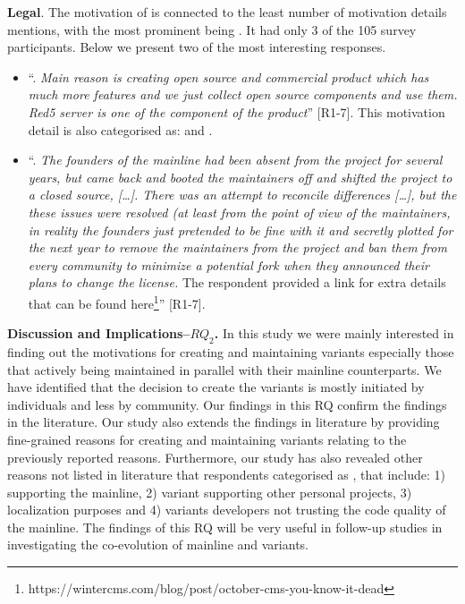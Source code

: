 \nd \textbf{Legal}. The motivation of  is connected to the least number of motivation details mentions, with the most prominent being . It had only 3 of the 105 survey participants. Below we present two of the most interesting responses.

\begin{itemize}[leftmargin=*]
\item ``. \emph{Main reason is creating open source and commercial product which has much more features and we just collect open source components and use them. Red5 server is one of the component of the product}'' [R1-7]. This motivation detail is also categorised as:  and .

\item ``. \emph{The founders of the mainline had been absent from the project for several years, but came back and booted the maintainers off and shifted the project to a closed source, [\ldots]. There was an attempt to reconcile differences [\ldots], but the these issues were resolved (at least from the point of view of the maintainers, in reality the founders just pretended to be fine with it and secretly plotted for the next year to remove the maintainers from the project and ban them from every community to minimize a potential fork when they announced their plans to change the license.} The respondent provided a link for extra details that can be found here\footnote{https://wintercms.com/blog/post/october-cms-you-know-it-dead}'' [R1-7].

\end{itemize}


\nd \textbf{Discussion and Implications--$RQ_2$.}
In this study we were mainly interested in finding out the motivations for creating and maintaining variants especially those that actively being maintained in parallel with their mainline counterparts.
We have identified that the decision to create the variants is mostly initiated by individuals and less by community.
Our findings in this RQ confirm the findings in the literature. 
Our study also extends the findings in literature by providing fine-grained reasons for creating and maintaining variants relating to the previously reported reasons.
Furthermore, our study has also revealed other reasons not listed in literature that respondents categorised as , that include: 1) supporting the mainline, 2) variant supporting other personal projects, 3) localization purposes and 4) variants developers not trusting the code quality of the mainline. 
The findings of this RQ will be very useful in follow-up studies in investigating the co-evolution of mainline and variants. 

